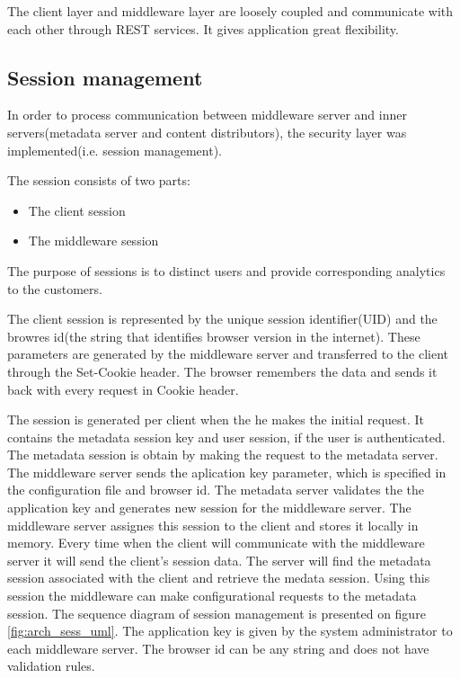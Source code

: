 The client layer and middleware layer are loosely coupled and communicate with each other through REST services. It gives application great flexibility.


\subsection{Session management}

In order to process communication between middleware server and inner servers(metadata server and content distributors), the security layer was implemented(i.e. session management).

The session consists of two parts: 

\begin{itemize}
	\item The client session
	\item The middleware session
\end{itemize}

The purpose of sessions is to distinct users and provide corresponding analytics to the customers.

The client session is represented by the unique session identifier(UID) and the browres id(the string that identifies browser version in the internet). These parameters are generated by the middleware server and transferred to the client through the Set-Cookie header. The browser remembers the data and sends it back with every request in Cookie header.

The session is generated per client when the he makes the initial request. It contains the metadata session key and user session, if the user is authenticated. The metadata session is obtain by making the request to the metadata server. The middleware server sends the aplication key parameter, which is specified in the configuration file and browser id. The metadata server validates the the application key and generates new session for the middleware server. The middleware server assignes this session to the client and stores it locally in memory. Every time when the client will communicate with the middleware server it will send the client's session data. The server will find the metadata session associated with the client and retrieve the medata session. Using this session the middleware can make configurational requests to the metadata session. The sequence diagram of session management is presented on figure \ref{fig:arch_sess_uml}. The application key is given by the system administrator to each middleware server. The browser id can be any string and does not have validation rules.


